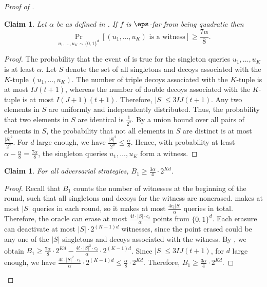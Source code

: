 \documentclass[11pt]{article}
\numberwithin{equation}{section}
\newtheorem{claim}[theorem]{Claim}
\theoremstyle{definition}
\theoremstyle{plain}
\begin{document}
\begin{proof}[Proof of ]
\begin{claim} \label{clm:quadratic_witness}
Let $\alpha$ be as defined in .
If $f$ is $\eps$-far from being quadratic then
\begin{equation*}
    \Pr_{u_1, \dots,u_{K} \sim \{0,1\}^d }[(u_1,\dots,u_{K}) \text{ is a witness}] \geq \frac{7\alpha}{8}. 
\end{equation*}
\end{claim}
\begin{proof}
    The probability that the event of  is true for the singleton queries $u_1, \dots, u_{K}$ is at least $\alpha$.  Let $S$ denote the set of all singletons and decoys associated with the $K$-tuple $(u_1, \dots, u_{K})$. The number of triple decoys associated with the $K$-tuple is at most $IJ(t+1)$, whereas the number of double decoys associated with the $K$-tuple is at most $I(J+1)(t+1)$. Therefore, $|S| \leq 3IJ(t+1)$. Any two elements in $S$ are uniformly and independently distributed. Thus, the probability that two elements in $S$ are identical is $\frac{1}{2^d}$. By a union bound over all pairs of elements in $S$, the probability that not all elements in $S$ are distinct is at most $\frac{|S|^2}{2^d}$. For $d$ large enough, we have $\frac{|S|^2}{2^d} \leq \frac{\alpha}{8}$. Hence, with probability at least $\alpha - \frac{\alpha}{8} = \frac{7\alpha}{8}$, the singleton queries $u_1, \dots, u_{K}$ form a witness. 
\end{proof}


\begin{claim} For all adversarial strategies, $B_1 \geq \frac{3\alpha}{4} \cdot 2^{Kd}$.  \label{clm:b1}
\end{claim}
\begin{proof}
    Recall that $B_1$ counts the number of witnesses at the beginning of the round, such that  all singletons and decoys for the witness are nonerased.  makes at most $|S|$ queries in each round, so it makes at most $\frac{4c_t|S|}{\alpha}$ queries in total. Therefore, the oracle can erase at most $\frac{4t\cdot |S| \cdot c_t}{\alpha}$ points from $\{0,1\}^d$. Each erasure can deactivate at most $|S| \cdot 2^{(K-1)d}$ witnesses, since the point erased could be any one of the $|S|$ singletons and decoys associated with the witness. By , we obtain $B_1 \geq \frac{7\alpha}{8} \cdot 2^{Kd} - \frac{4t \cdot |S|^2\cdot c_t}{\alpha} \cdot 2^{(K-1)d}$. Since $|S| \leq 3IJ(t+1)$, for $d$ large enough, we have $\frac{4t \cdot |S|^2 \cdot c_t}{\alpha} \cdot 2^{(K-1)d} \leq \frac{\alpha}{8} \cdot 2^{Kd}$. Therefore, $B_1 \geq \frac{3\alpha}{4}\cdot 2^{Kd}$. 
\end{proof}



\end{proof}
\end{document}
